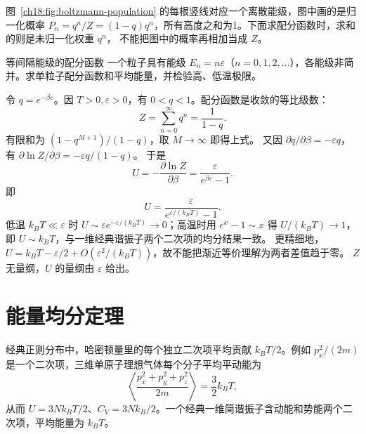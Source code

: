 \begin{center}
\label{ch18:fig:boltzmann-population}
\end{center}
图~\ref{ch18:fig:boltzmann-population} 的每根竖线对应一个离散能级，图中画的是归一化概率
$P_n=q^n/Z=(1-q)q^n$，所有高度之和为1。下面求配分函数时，求和的则是未归一化权重 $q^n$，
不能把图中的概率再相加当成 $Z$。

\begin{origexamplebox}{等间隔能级的配分函数}
一个粒子具有能级 $E_n=n\varepsilon$（$n=0,1,2,\ldots$），各能级非简并。求单粒子配分函数和平均能量，并检验高、低温极限。
\end{origexamplebox}
\begin{xesolution}
令 $q=e^{-\beta\varepsilon}$。因 $T>0,\varepsilon>0$，有 $0<q<1$。配分函数是收敛的等比级数：
\[
 Z=\sum_{n=0}^\infty q^n=\frac1{1-q}.
\]
有限和为 $(1-q^{M+1})/(1-q)$，取 $M\to\infty$ 即得上式。
又因 $\partial q/\partial\beta=-\varepsilon q$，有
$\partial\ln Z/\partial\beta=-\varepsilon q/(1-q)$。
于是
\[
 U=-\frac{\partial\ln Z}{\partial\beta}
 =\frac{\varepsilon}{e^{\beta\varepsilon}-1}.
\]
即
\[
 \boxed{U=\frac{\varepsilon}{e^{\varepsilon/(k_BT)}-1}}.
\]
低温 $k_BT\ll\varepsilon$ 时 $U\sim\varepsilon e^{-\varepsilon/(k_BT)}\to0$；高温时用
$e^x-1\sim x$ 得 $U/(k_BT)\to1$，即 $U\sim k_BT$，与一维经典谐振子两个二次项的均分结果一致。
更精细地，$U=k_BT-\varepsilon/2+O(\varepsilon^2/(k_BT))$，故不能把渐近等价理解为两者差值趋于零。
$Z$ 无量纲，$U$ 的量纲由 $\varepsilon$ 给出。
\end{xesolution}

\section{能量均分定理}

经典正则分布中，哈密顿量里的每个独立二次项平均贡献 $k_BT/2$。例如
$p_x^2/(2m)$ 是一个二次项，三维单原子理想气体每个分子平均平动能为
\begin{equation}
 \left\langle\frac{p_x^2+p_y^2+p_z^2}{2m}\right\rangle=\frac32k_BT,
\end{equation}
从而 $U=3Nk_BT/2$、$C_V=3Nk_B/2$。一个经典一维简谐振子含动能和势能两个二次项，平均能量为 $k_BT$。

